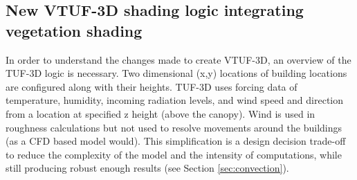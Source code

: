\documentclass[final,3p,times,authoryear]{elsarticle}
\begin{document}

\subsection{New VTUF-3D shading logic integrating vegetation shading}\label{sec:integration}
In order to understand the changes made to create VTUF-3D, an overview of the TUF-3D logic is necessary. Two dimensional (x,y) locations of building locations are configured along with their heights. TUF-3D uses forcing data of temperature, humidity, incoming radiation levels, and wind speed and direction from a location at specified z height (above the canopy). Wind is used in roughness calculations but not used to resolve movements around the buildings (as a CFD based model would). This simplification is a design decision trade-off to reduce the complexity of the model and the intensity of computations, while still producing robust enough results (see Section \ref{sec:convection}).
\end{document}
